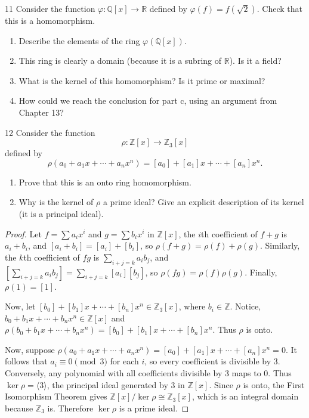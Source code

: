 \begin{problem}{11}
    Consider the function $\varphi : \mathbb{Q}[x] \to \mathbb{R}$ defined by
    $\varphi(f) = f(\sqrt{2})$. Check that this is a homomorphism.
    \begin{enumerate}
        \item[(a)] Describe the elements of the ring $\varphi(\mathbb{Q}[x])$.
        \item[(b)] This ring is clearly a domain (because it is a subring of $\mathbb{R}$).
        Is it a field?
        \item[(c)] What is the kernel of this homomorphism? Is it prime or maximal?
        \item[(d)] How could we reach the conclusion for part c, using an argument from
        Chapter 13?
    \end{enumerate}
\end{problem}
\unsolved

\begin{problem}{12}
    Consider the function 
    \[\rho : \mathbb{Z}[x] \longrightarrow \mathbb{Z}_3 [x]\]
    defined by 
    \[\rho(a_0 + a_1 x + \cdots + a_n x^n) = [a_0] + [a_1]x + \cdots + [a_n]x^n.\]
    \begin{enumerate}
        \item Prove that this is an onto ring homomorphism.
        \item Why is the kernel of $\rho$ a prime ideal? Give an explicit description of its kernel (it is a principal ideal).
    \end{enumerate}
\end{problem}
\solved

\begin{proof}
    Let $f = \sum a_i x^i$ and
    $g = \sum b_i x^i$ in $\mathbb{Z}[x]$, the $i$th coefficient of $f + g$
    is $a_i + b_i$, and $[a_i + b_i] = [a_i] + [b_i]$, so
    $\rho(f + g) = \rho(f) + \rho(g)$.
    Similarly, the $k$th coefficient of $fg$ is $\sum_{i+j=k} a_i b_j$, and
    $\left[\sum_{i+j=k} a_i b_j\right] = \sum_{i+j=k} [a_i][b_j]$,
    so $\rho(fg) = \rho(f)\rho(g)$.
    Finally, $\rho(1) = [1]$.

    Now, let $[b_0] + [b_1]x + \cdots + [b_n]x^n \in \mathbb{Z}_3[x]$,
    where $b_i \in \mathbb{Z}$.
    Notice, $b_0 + b_1 x + \cdots + b_n x^n \in \mathbb{Z}[x]$ and
    $\rho(b_0 + b_1 x + \cdots + b_n x^n) = [b_0] + [b_1]x + \cdots + [b_n]x^n$.
    Thus $\rho$ is onto.

    Now, suppose $\rho(a_0 + a_1 x + \cdots + a_n x^n) = [a_0] + [a_1]x + \cdots + [a_n]x^n = 0$.
    It follows that $a_i \equiv 0 \pmod{3}$ for each $i$, so every coefficient
    is divisible by $3$. Conversely, any polynomial with all coefficients
    divisible by $3$ maps to $0$.
    Thus $\ker \rho = \langle 3 \rangle$, the principal ideal generated by $3$
    in $\mathbb{Z}[x]$.
    Since $\rho$ is onto, the First Isomorphism Theorem gives
    $\mathbb{Z}[x]/\ker \rho \cong \mathbb{Z}_3[x]$, which is an integral
    domain because $\mathbb{Z}_3$ is. Therefore $\ker \rho$ is a prime ideal.
\end{proof}

